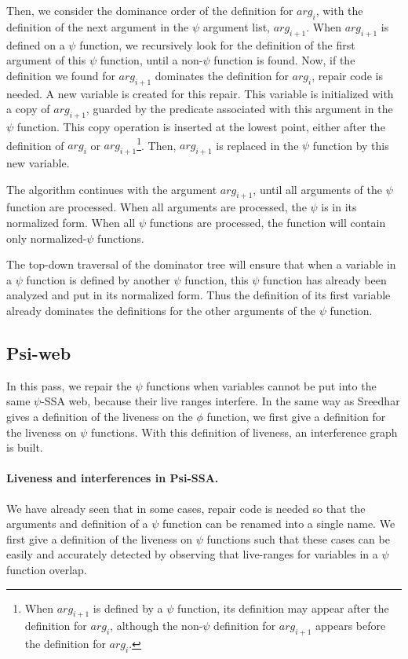 Then, we consider the dominance order of the definition for
$arg_i$, with the definition of the next argument in the $\psi$
argument list, $arg_{i+1}$. When $arg_{i+1}$ is defined on a $\psi$
function, we recursively look for the definition of the first
argument of this $\psi$ function, until a non-$\psi$ function is
found. Now, if the definition we found for $arg_{i+1}$ dominates the
definition for $arg_i$, repair code is needed. A new variable is
created for this repair. This variable is initialized with a copy of
$arg_{i+1}$, guarded by the predicate associated with this argument in
the $\psi$ function. This copy operation is inserted at the lowest
point, either after the definition of $arg_i$ or $arg_{i+1}
$\footnote{When $arg_{i+1}$ is defined by a $\psi$ function, its
definition may appear after the definition for $arg_i$, although the
non-$\psi$ definition for $arg_{i+1}$ appears before the definition
for $arg_i$.}. Then, $arg_{i+1}$ is replaced in the $\psi$ function
by this new variable.

The algorithm continues with the argument $arg_{i+1}$, until all
arguments of the $\psi$ function are processed. When all arguments
are processed, the $\psi$ is in its normalized form. When all $\psi$
functions are processed, the function will contain only
normalized-$\psi$ functions.

The top-down traversal of the dominator tree will ensure that when a
variable in a $\psi$ function is defined by another $\psi$ function,
this $\psi$ function has already been analyzed and put in its
normalized form. Thus the definition of its first variable already
dominates the definitions for the other arguments of the $\psi$
function.

\subsection{Psi-web}

In this pass, we repair the $\psi$ functions when variables cannot be
put into the same $\psi$-SSA web, because their live ranges
interfere. In the same way as Sreedhar gives a definition of the
liveness on the $\phi$ function, we first give a definition for the
liveness on $\psi$ functions. With this definition of liveness, an
interference graph is built.

\paragraph{Liveness and interferences in Psi-SSA.}
We have already seen that in some cases, repair code is needed so that
the arguments and definition of a $\psi$ function can be renamed into
a single name. We first give a definition of the liveness on $\psi$
functions such that these cases can be easily and accurately detected
by observing that live-ranges for variables in a $\psi$ function
overlap.

